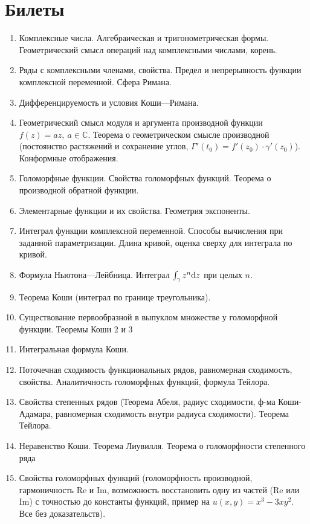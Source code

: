 \section{Билеты}

\begin{enumerate}
\item Комплексные числа. Алгебраическая и тригонометрическая формы. Геометрический смысл операций над комплексными числами, корень.
\item Ряды с комплексными членами, свойства. Предел и непрерывность функции комплексной переменной. Сфера Римана.
\item Дифференцируемость и условия Коши—Римана.
\item Геометрический смысл модуля и аргумента производной функции \( f(z)=az,\ a\in\mathbb{C} \). Теорема о геометрическом смысле производной (постоянство растяжений и сохранение углов, \( \Gamma'(t_0)=f'(z_0)\cdot\gamma'(z_0) \)). Конформные отображения.
\item Голоморфные функции. Свойства голоморфных функций. Теорема о производной обратной функции.
\item Элементарные функции и их свойства. Геометрия экспоненты.
\item Интеграл функции комплексной переменной. Способы вычисления при заданной параметризации. Длина кривой, оценка сверху для интеграла по кривой.
\item Формула Ньютона—Лейбница. Интеграл \( \int_\gamma z^n\mathrm{d} z \) при целых \( n \).
\item Теорема Коши (интеграл по границе треугольника).
\item Существование первообразной в выпуклом множестве у голоморфной функции. Теоремы Коши 2 и 3
\item Интегральная формула Коши.
\item Поточечная сходимость функциональных рядов, равномерная сходимость, свойства. Аналитичность голоморфных функций, формула Тейлора.
\item Свойства степенных рядов (Теорема Абеля, радиус сходимости, ф-ма Коши-Адамара, равномерная сходимость внутри радиуса сходимости). Теорема Тейлора.
\item Неравенство Коши. Теорема Лиувилля. Теорема о голоморфности степенного ряда
\item Свойства голоморфных функций (голоморфность производной, гармоничность Re и Im, возможность восстановить одну из частей (Re или Im) с точностью до константы функций, пример на \( u(x,y)=x^3-3xy^2 \). Все без доказательств).

\end{enumerate}
